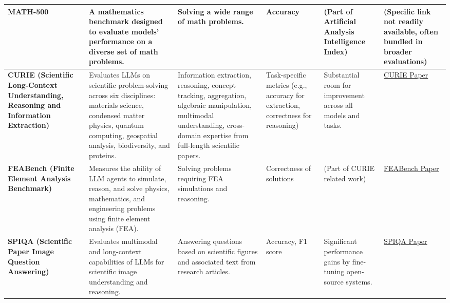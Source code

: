 \begin{landscape}
\begin{longtable}{|p{3.5cm}|p{5.5cm}|p{4cm}|p{1.8cm}|p{3.2cm}|p{2.7cm}|}
\hline
\textbf{MATH-500} & A mathematics benchmark designed to evaluate models' performance on a diverse set of math problems. & Solving a wide range of math problems. & Accuracy & (Part of Artificial Analysis Intelligence Index) & (Specific link not readily available, often bundled in broader evaluations) \\
\hline
\textbf{CURIE (Scientific Long-Context Understanding, Reasoning and Information Extraction)} & Evaluates LLMs on scientific problem-solving across six disciplines: materials science, condensed matter physics, quantum computing, geospatial analysis, biodiversity, and proteins. & Information extraction, reasoning, concept tracking, aggregation, algebraic manipulation, multimodal understanding, cross-domain expertise from full-length scientific papers. & Task-specific metrics (e.g., accuracy for extraction, correctness for reasoning) & Substantial room for improvement across all models and tasks. & \href{https://arxiv.org/abs/2404.02029}{CURIE Paper} \\
\hline
\textbf{FEABench (Finite Element Analysis Benchmark)} & Measures the ability of LLM agents to simulate, reason, and solve physics, mathematics, and engineering problems using finite element analysis (FEA). & Solving problems requiring FEA simulations and reasoning. & Correctness of solutions & (Part of CURIE related work) & \href{https://arxiv.org/abs/2404.02029}{FEABench Paper} \cite{zhu2024enhancingportfoliooptimizationtransformergan}\\
\hline
\textbf{SPIQA (Scientific Paper Image Question Answering)} & Evaluates multimodal and long-context capabilities of LLMs for scientific image understanding and reasoning. & Answering questions based on scientific figures and associated text from research articles. & Accuracy, F1 score & Significant performance gains by fine-tuning open-source systems. & \href{https://arxiv.org/abs/2404.02029}{SPIQA Paper} \\
\hline %



\end{longtable}
\end{landscape}
